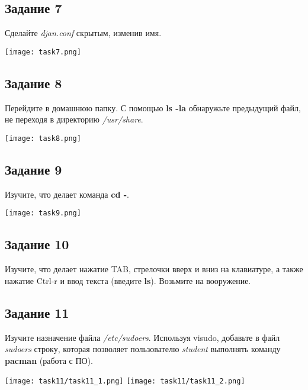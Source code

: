 \documentclass[12pt, a4paper]{report}
\begin{document}
			\subsection*{Задание 7}
			Сделайте \textit{djan.conf} скрытым, изменив имя.
			\lstset{style=mystyle}
			
			\begin{center}
				\texttt{[image: task7.png]}
			\end{center}
	
			\subsection*{Задание 8}
			Перейдите в домашнюю папку. С помощью \textbf{ls -la} обнаружьте предыдущий файл, не переходя в директорию \textit{/usr/share}.
			\lstset{style=mystyle}
			
			\begin{center}
				\texttt{[image: task8.png]}
			\end{center}
	
			\subsection*{Задание 9}
			Изучите, что делает команда \textbf{cd -}.
			\lstset{style=mystyle}
			
			\begin{center}
				\texttt{[image: task9.png]}
			\end{center}
	
			\subsection*{Задание 10}
			Изучите, что делает нажатие TAB, стрелочки вверх и вниз на клавиатуре, а также нажатие Ctrl-r и ввод текста (введите \textbf{ls}). Возьмите на вооружение.
	
			\subsection*{Задание 11}
			Изучите назначение файла \textit{/etc/sudoers}. Используя visudo, добавьте в файл \textit{sudoers} строку, которая позволяет пользователю \textit{student} выполнять команду \textbf{pacman} (работа с ПО).
			\begin{center}
				\texttt{[image: task11/task11\_1.png]}
				\texttt{[image: task11/task11\_2.png]}
			\end{center}
	
\end{document}
